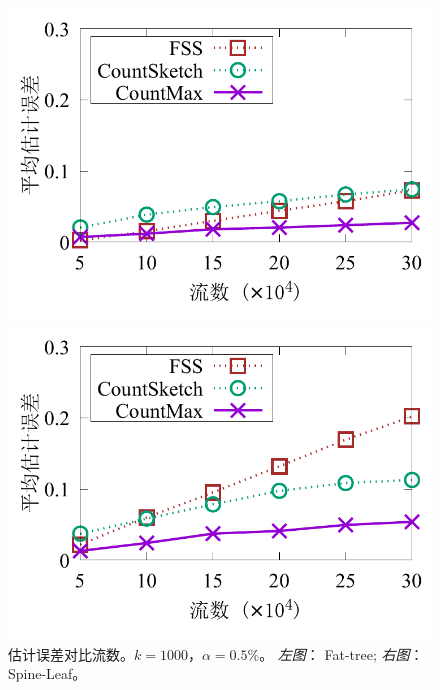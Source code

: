 \begin{figure}[ht]
	\centering
	\begin{minipage}[t]{0.49\linewidth}
		\centering
		\includegraphics[width=\linewidth]{fig/ft_flow_appr_1000_095.pdf}
	\end{minipage}\vspace{-0.6em}%
	\begin{minipage}[t]{0.49\linewidth}
		\centering
		\includegraphics[width=\linewidth]{fig/hy_flow_appr_1000_095.pdf}
	\end{minipage}\vspace{-0.6em}
	\caption{\textnormal{估计误差对比流数。$k=1000$，$\alpha = 0.5\%$。 \textit{左图}： Fat-tree; \textit{右图}： Spine-Leaf。}}
	\label{fig:acc,f,1000,5}
\end{figure}


